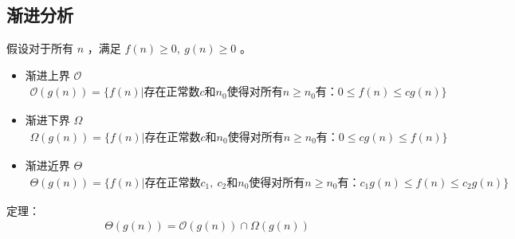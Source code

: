 \documentclass[letterpaper,10pt,english]{sphinxmanual}
\begin{document}
\subsection{渐进分析}
\label{\detokenize{mathematicsAlgorithm/01_complexity:id2}}
假设对于所有 \(n\) ，满足 \(f(n) \geqslant 0,\ g(n) \geqslant 0\) 。
\begin{itemize}
\item {} 
渐进上界 \(\mathcal{O}\)
\begin{equation*}
\begin{split}\mathcal{O}(g(n)) = \{ f(n) | \text{存在正常数} c \text{和} n_0 \text{使得对所有} n \geqslant n_0 \text{有：} 0 \leqslant f(n) \leqslant cg(n) \}\end{split}
\end{equation*}
\item {} 
渐进下界 \(\Omega\)
\begin{equation*}
\begin{split}\Omega(g(n)) = \{ f(n) | \text{存在正常数} c \text{和} n_0 \text{使得对所有} n \geqslant n_0 \text{有：} 0 \leqslant cg(n) \leqslant f(n) \}\end{split}
\end{equation*}
\item {} 
渐进近界 \(\Theta\)
\begin{equation*}
\begin{split}\Theta(g(n)) = \{ f(n) | \text{存在正常数} c_1,\ c_2 \text{和} n_0 \text{使得对所有} n \geqslant n_0 \text{有：} c_1g(n) \leqslant f(n) \leqslant c_2g(n) \}\end{split}
\end{equation*}
\end{itemize}

定理：
\begin{equation*}
\begin{split}\Theta(g(n)) = \mathcal{O}(g(n)) \cap \Omega(g(n))\end{split}
\end{equation*}
\end{document}
